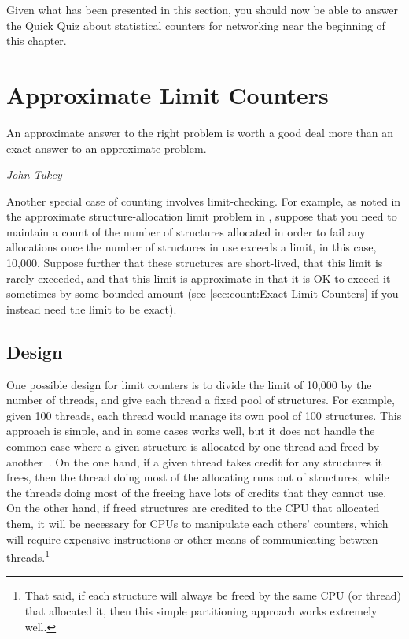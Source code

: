 Given what has been presented in this section, you should now be able
to answer the Quick Quiz about statistical counters for networking
near the beginning of this chapter.

\section{Approximate Limit Counters}
\label{sec:count:Approximate Limit Counters}
%
\epigraph{An approximate answer to the right problem is worth a good deal
	  more than an exact answer to an approximate problem.}
	 {\emph{John Tukey}}

Another special case of counting involves limit-checking.
For example, as noted in the approximate structure-allocation limit
problem in \QuickQuizRef{\QcountQapproxcnt},
suppose that you need to maintain a count of the number of
structures allocated in order to fail any allocations once the number
of structures in use exceeds a limit, in this case, 10,000.
Suppose further that these structures are short-lived, that this
limit is rarely exceeded, and that this limit is approximate in
that it is OK to exceed it sometimes by some bounded amount
(see \cref{sec:count:Exact Limit Counters}
if you instead need the limit to be exact).

\subsection{Design}

One possible design for limit counters is to divide the limit of 10,000
by the number of threads, and give each thread a fixed pool of structures.
For example, given 100 threads, each thread would manage its own pool
of 100 structures.
This approach is simple, and in some cases works well, but it does not
handle the common case where a given structure is allocated by one
thread and freed by another~\cite{McKenney93}.
On the one hand, if a given thread takes credit for any structures it
frees, then the thread doing most of the allocating runs out
of structures, while the threads doing most of the freeing have lots
of credits that they cannot use.
On the other hand, if freed structures are credited to the CPU that
allocated them, it will be necessary for CPUs to manipulate each
others' counters, which will require expensive  instructions
or other means of communicating between threads.\footnote{
	That said, if each structure will always be freed
	by the same CPU (or thread) that allocated it, then
	this simple partitioning approach works extremely well.}


